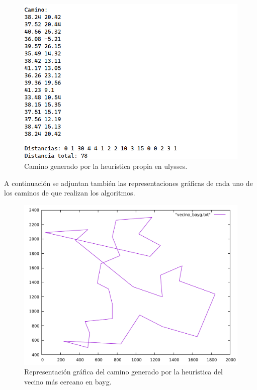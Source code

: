 \begin{figure}[H]
  \centering
  \includegraphics[scale=0.5]{img/dist-kr-ulysses.png}
  \caption{Camino generado por la heurística propia en ulysses.}
\end{figure} 

A continuación se adjuntan también las representaciones gráficas de cada
uno de los caminos de que realizan los algoritmos.

\begin{figure}[H]
  \centering
  \includegraphics[scale=0.5]{../src/vecino_bayg.pdf}
  \caption{Representación gráfica del camino generado por la heurística del vecino más cercano en bayg.}
\end{figure} 

